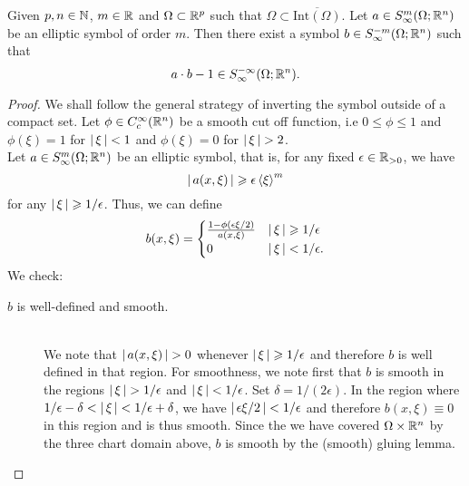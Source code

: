 \documentclass[12pt]{article}
\begin{document}
\begin{flemma}
    Given $p, n \in \N$, $m \in \R$ and $\Omega \subset \R^p$ such that $\Omega \subset \overline{\mathrm{Int}(\Omega)}$. Let $a \in S^m_\infty(\Omega; \R^n)$ be an elliptic symbol of order $m$. Then there exist a symbol $b \in S^{-m}_\infty(\Omega; \R^n)$ such that 
    \[
    a \cdot b - 1 \in S^{-\infty}_\infty(\Omega; \R^n). 
    \]
\end{flemma}
\begin{proof}
    We shall follow the general strategy of inverting the symbol outside of a compact set. Let $\phi \in C^\infty_c(\R^n)$ be a smooth cut off function, i.e $0 \leq \phi \leq 1$ and $ \phi(\xi) = 1$ for $\abs{\xi} < 1$ and $\phi(\xi) = 0 $ for $\abs{\xi} > 2$. \\
    
    Let $a \in S^{m}_\infty(\Omega; \R^n)$ be an elliptic symbol, that is, for any fixed $\epsilon \in \R_{> 0}$, we have 
    \[
    \abs{a(x, \xi)} \geq \epsilon \sym[\xi]^m
    \]
    for any $\abs{\xi} \geq 1/\epsilon$. Thus, we can define 
    \begin{align*}
        b(x, \xi) = 
        \begin{cases}
            \frac{1 - \phi( \epsilon \xi /2)}{a(x, \xi)} & \abs{\xi} \geq 1/ \epsilon \\
            0 & \abs{\xi} < 1 / \epsilon. 
        \end{cases}
    \end{align*}
    We check: 
    \begin{description}
        \item[$b$ is well-defined and smooth. ] \hfill \\
        We note that $\abs{a(x, \xi)} > 0$ whenever $\abs{\xi} \geq 1/\epsilon$ and therefore $b$ is well defined in that region. For smoothness, we note first that $b$ is smooth in the regions $\abs{\xi} > 1/ \epsilon$ and $\abs{\xi} < 1/\epsilon$. Set $\delta = 1/(2 \epsilon)$. In the region where $1/\epsilon - \delta < \abs{\xi} < 1/\epsilon + \delta$, we have $\abs{\epsilon \xi/ 2} < 1/\epsilon$ and therefore $b(x, \xi) \equiv 0$ in this region and is thus smooth. Since the we have covered $\Omega \times \R^n$ by the three chart domain above, $b$ is smooth by the (smooth) gluing lemma. 
        

\end{description}
\end{proof}
\end{document}
